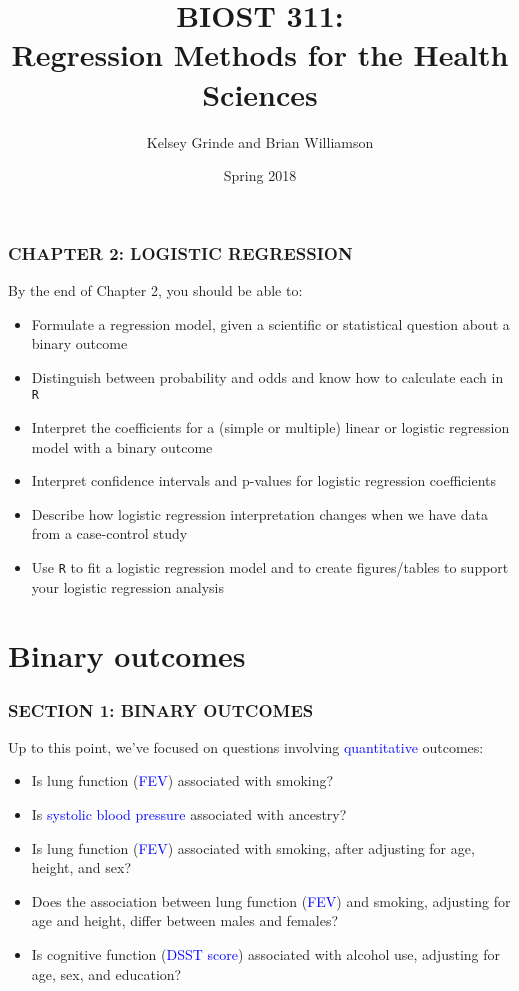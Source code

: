 \documentclass[12pt, 
hyperref={colorlinks=true, linkcolor=blue, urlcolor=cyan}]{beamer}
\title{BIOST 311: \\ Regression Methods for the Health Sciences}
\author{Kelsey Grinde and Brian Williamson}
\institute{UW Biostatistics}
\date{Spring 2018}
\begin{document}
\begin{frame}
\titlepage\thispagestyle{empty}
\end{frame}

  
\setcounter{framenumber}{\value{chap1}}

\begin{frame}
\frametitle{CHAPTER 2: LOGISTIC REGRESSION}

By the end of Chapter 2, you should be able to:
\begin{itemize}
\item Formulate a regression model, given a scientific or statistical question about a binary outcome
\item Distinguish between probability and odds and know how to calculate each in \texttt{R}
\item Interpret the coefficients for a (simple or multiple) linear or logistic regression model with a binary outcome
\item Interpret confidence intervals and p-values for logistic regression coefficients
\item Describe how logistic regression interpretation changes when we have data from a case-control study
\item Use \texttt{R} to fit a logistic regression model  and to create figures/tables to support your logistic regression analysis
\end{itemize}
\end{frame}

\section{Binary outcomes}
\begin{frame}
\frametitle{SECTION 1: BINARY OUTCOMES}
Up to this point, we've focused on questions involving \textcolor{blue}{quantitative} outcomes:

\begin{itemize}
\item Is lung function (\textcolor{blue}{FEV}) associated with smoking?
\item Is \textcolor{blue}{systolic blood pressure} associated with ancestry?
\item Is lung function (\textcolor{blue}{FEV}) associated with smoking, after adjusting for age, height, and sex?
\item Does the association between lung function (\textcolor{blue}{FEV}) and smoking, adjusting for age and height, differ between males and females?
\item Is cognitive function (\textcolor{blue}{DSST score}) associated with alcohol use, adjusting for age, sex, and education?
\end{itemize}
\end{frame}
\end{document}
